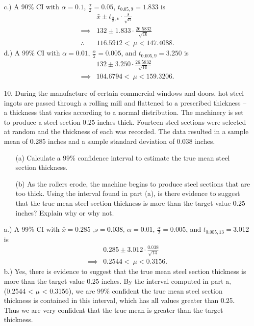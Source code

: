 \documentclass{report}
\begin{document}
\bigbreak \noindent 
c.) A 90\% CI with $\alpha = 0.1$, $\frac{\alpha}{2} = 0.05$, $t_{0.05,9} =1.833$ is 
\begin{align*}
    &\bar{x} \pm t_{\frac{\alpha}{2}, \nu} \cdot \frac{s}{\sqrt{n}} \\
    \implies &132 \pm 1.833 \cdot \frac{26.5832}{\sqrt{10}} \\
    \therefore\quad &116.5912 <\ \mu < 147.4088
.\end{align*}
\bigbreak \noindent 
d.) A 99\% CI with $\alpha=0.01$, $\frac{\alpha}{2} = 0.005$, and $t_{0.005, 9} = 3.250$ is
\begin{align*}
    &132 \pm 3.250 \cdot \frac{26.5832}{\sqrt{10}} \\
    \implies &104.6794 <\ \mu < 159.3206
.\end{align*}

\pagebreak \bigbreak \noindent 
\begin{mdframed}
10. During the manufacture of certain commercial windows and doors, hot steel ingots are passed through a rolling mill and flattened to a prescribed thickness – a thickness that varies according to a normal distribution. The machinery is set to produce a steel section 0.25 inches thick. Fourteen steel sections were selected at random and the thickness of each was recorded. The data resulted in a sample mean of 0.285 inches and a sample standard deviation of 0.038 inches.
\begin{itemize}
    \item[(a)] Calculate a 99\% confidence interval to estimate the true mean steel section thickness.
    \item[(b)] As the rollers erode, the machine begins to produce steel sections that are too thick. Using the interval found in part (a), is there evidence to suggest that the true mean steel section thickness is more than the target value 0.25 inches? Explain why or why not.
\end{itemize}
\end{mdframed}
\bigbreak \noindent 
a.) A 99\% CI with $\bar{x} = 0.285$ ,$s = 0.038$, $\alpha=0.01$, $\frac{\alpha}{2} = 0.005$, and $t_{0.005, 13} = 3.012$ is 
\begin{align*}
    &0.285 \pm 3.012 \cdot \frac{0.038}{\sqrt{14}} \\
    \implies  &0.2544 <\ \mu <0.3156
.\end{align*}
\bigbreak \noindent 
b.) Yes, there is evidence to suggest that the true mean steel section thickness is more than the target value 0.25 inches. By the interval computed in part a, (0.2544 < $\mu$ < 0.3156), we are 99\% confident the true mean steel section thickness is contained in this interval, which has all values greater than 0.25. Thus we are very confident that the true mean is greater than the target thickness.



 
\end{document}
